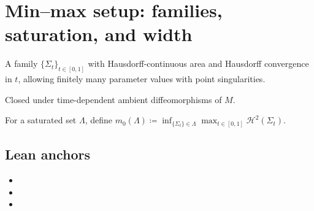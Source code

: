 \chapter{Min--max setup: families, saturation, and width}

\begin{definition}\label{def:gen-family}
A family $\{\Sigma_t\}_{t\in[0,1]}$ with Hausdorff-continuous area and Hausdorff convergence in $t$, allowing finitely many parameter values with point singularities. \uses{}
\end{definition}

\begin{definition}\label{def:saturated}
Closed under time-dependent ambient diffeomorphisms of $M$. \uses{}
\end{definition}

\begin{definition}[Width]\label{def:m0}
For a saturated set $\Lambda$, define
$m_0(\Lambda) \coloneqq \inf_{\{\Sigma_t\}\in \Lambda} \max_{t\in[0,1]} \mathcal H^2(\Sigma_t)$.
\uses{}
\end{definition}

\section*{Lean anchors}
\begin{itemize}
  \item {}
  \item {}
  \item {}
\end{itemize}
